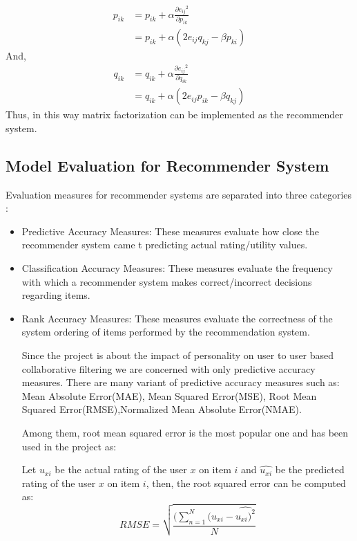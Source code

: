 \begin{equation}
\begin{split}
	p_{ik} &= p_{ik} + \alpha \frac{\partial {e_{ij}}^2}{\partial p_{ik}} \\ 
	& = p_{ik}  + \alpha (2e_{ij} q_{kj} - \beta p_{ki})
\end{split}
\end{equation}
And,
\begin{equation}
\begin{split}
	q_{ik} &= q_{ik} + \alpha \frac{\partial {e_{ij}}^2}{\partial q_{ik}} \\ 
	& = q_{ik}  + \alpha (2e_{ij} p_{ik} - \beta q_{kj})
\end{split}
\end{equation}
Thus, in this way matrix factorization can be implemented as the recommender system.
\subsection{Model Evaluation for Recommender System}
Evaluation measures for recommender systems are separated into three categories \cite{eval}:
\begin{itemize}
	\item Predictive Accuracy Measures: These measures evaluate how close the recommender system came t predicting actual rating/utility values.
	\item Classification Accuracy Measures: These measures evaluate the frequency with which a recommender system makes correct/incorrect decisions regarding items.
	\item Rank Accuracy Measures: These measures evaluate the correctness of the system ordering of items performed by the recommendation system.

	Since the project is about the impact of personality on user to user based collaborative filtering we are concerned with only predictive accuracy measures. There are many variant of predictive accuracy measures such as: Mean Absolute Error(MAE), Mean Squared Error(MSE), Root Mean Squared Error(RMSE),Normalized Mean Absolute Error(NMAE).

Among them, root mean squared error is the most popular one and has been used in the project as:

Let $u_{xi}$ be the actual rating of the user $x$ on item $i$ and $\widehat{u_{xi}}$ be the predicted rating of the user $x$ on item $i$, then, the root squared error can be computed as:
\begin{equation}
	RMSE = \sqrt{\frac{(\sum_{n=1}^N(u_{xi}-\widehat{u_{xi})^2}}{N}}
\end{equation}
\end{itemize}
